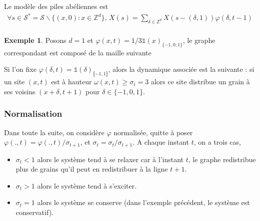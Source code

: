 \documentclass{article}
\theoremstyle{definition}
\newtheorem{exmp}{Exemple}[section]
\begin{document}
Le modèle des piles abéliennes est
\begin{align*}
	\forall s\in\mathcal{S}^* = \mathcal{S}\backslash\{(x,0) : x\in\mathbb{Z}^d\},\, 
	X(s) = \sum_{\delta\in\mathbb{Z}^d} X(s-(\delta, 1))\varphi(\delta, t-1)\\
\end{align*}
\begin{exmp}
Posons $d=1$ et $\varphi(x,t) = 1/3\mathds{1}(x)_{\{-1,0,1\}}$, le graphe correspondant est composé de la maille suivante \begin{center}  
\end{center}
Si l'on fixe $\varphi(\delta,t) = \mathds{1}(\delta)_{\llbracket -1, 1\rrbracket}$, alors la dynamique associée est la suivante : si un site $(x,t)$ est à hauteur $\omega(x,t)\geq \sigma_t = 3$ alors ce site distribue un grain à ses voisins $(x+\delta,t+1)$ pour $\delta\in \{-1,0,1\}$.
\end{exmp}
\subsubsection{Normalisation}
Dans toute la suite, on considère $\varphi$ normalisée, quitte à poser $\varphi(., t) = \varphi(., t)/\sigma_{t+1}$, et $\sigma_t = \sigma_t/\sigma_{t+1}$. A chaque instant $t$, on a trois cas, 
\begin{itemize}
	\item $\sigma_t < 1$ alors le système tend à se relaxer car à l'instant $t$, le graphe redistribue plus de grains qu'il peut en redistribuer à la ligne $t+1$.
	\item $\sigma_t > 1$ alors le système tend à s'exciter.
	\item $\sigma_t = 1$ alors le système se conserve (dans l'exemple précédent, le système est conservatif).
\end{itemize}
\end{document}
